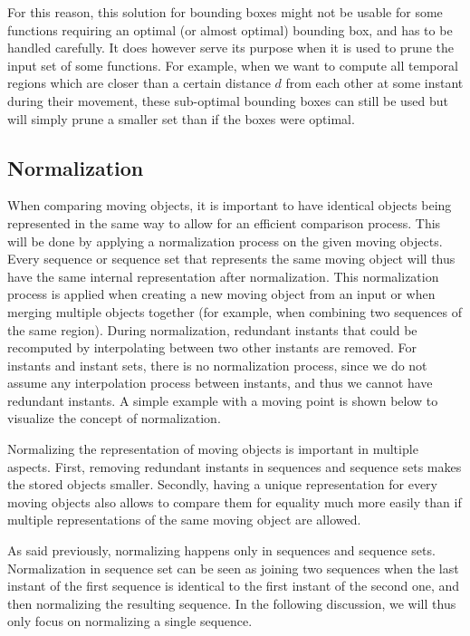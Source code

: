 For this reason, this solution for bounding boxes might not be usable for some functions requiring an optimal (or almost optimal) bounding box, and has to be handled carefully. It does however serve its purpose when it is used to prune the input set of some functions. For example, when we want to compute all temporal regions which are closer than a certain distance $d$ from each other at some instant during their movement, these sub-optimal bounding boxes can still be used but will simply prune a smaller set than if the boxes were optimal.

\subsection{Normalization}
\label{section:normalization}

When comparing moving objects, it is important to have identical objects being represented in the same way to allow for an efficient comparison process. This will be done by applying a normalization process on the given moving objects. Every sequence or sequence set that represents the same moving object will thus have the same internal representation after normalization. This normalization process is applied when creating a new moving object from an input or when merging multiple objects together (for example, when combining two sequences of the same region). During normalization, redundant instants that could be recomputed by interpolating between two other instants are removed. For instants and instant sets, there is no normalization process, since we do not assume any interpolation process between instants, and thus we cannot have redundant instants. A simple example with a moving point is shown below to visualize the concept of normalization.
    

Normalizing the representation of moving objects is important in multiple aspects. First, removing redundant instants in sequences and sequence sets makes the stored objects smaller. Secondly, having a unique representation for every moving objects also allows to compare them for equality much more easily than if multiple representations of the same moving object are allowed.

As said previously, normalizing happens only in sequences and sequence sets. Normalization in sequence set can be seen as joining two sequences when the last instant of the first sequence is identical to the first instant of the second one, and then normalizing the resulting sequence. In the following discussion, we will thus only focus on normalizing a single sequence.

